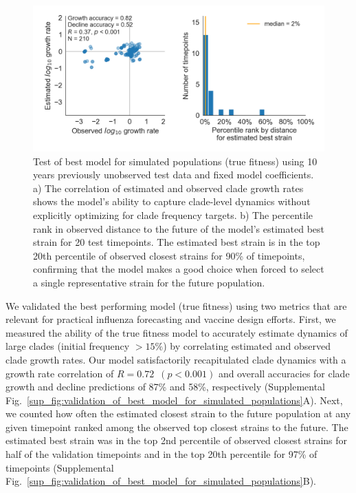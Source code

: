 \begin{figure}[ht]
  \begin{center}
  \includegraphics[width=\textwidth]{figures/test-of-best-model-for-simulated-populations.png}
  \caption{
  Test of best model for simulated populations (true fitness) using 10 years previously unobserved test data and fixed model coefficients.
  a) The correlation of estimated and observed clade growth rates shows the model's ability to capture clade-level dynamics without explicitly optimizing for clade frequency targets.
  b) The percentile rank in observed distance to the future of the model's estimated best strain for 20 test timepoints.
  The estimated best strain is in the top 20th percentile of observed closest strains for 90\% of timepoints, confirming that the model makes a good choice when forced to select a single representative strain for the future population.
  }
  \label{fig:test_of_best_model_for_simulated_populations}
  \end{center}
\end{figure}

We validated the best performing model (true fitness) using two metrics that are relevant for practical influenza forecasting and vaccine design efforts.
First, we measured the ability of the true fitness model to accurately estimate dynamics of large clades (initial frequency $>15\%$) by correlating estimated and observed clade growth rates.
Our model satisfactorily recapitulated clade dynamics with a growth rate correlation of $R = 0.72$~$(p < 0.001)$ and overall accuracies for clade growth and decline predictions of 87\% and 58\%, respectively (Supplemental Fig.~\ref{sup_fig:validation_of_best_model_for_simulated_populations}A).
Next, we counted how often the estimated closest strain to the future population at any given timepoint ranked among the observed top closest strains to the future.
The estimated best strain was in the top 2nd percentile of observed closest strains for half of the validation timepoints and in the top 20th percentile for 97\% of timepoints (Supplemental Fig.~\ref{sup_fig:validation_of_best_model_for_simulated_populations}B).

